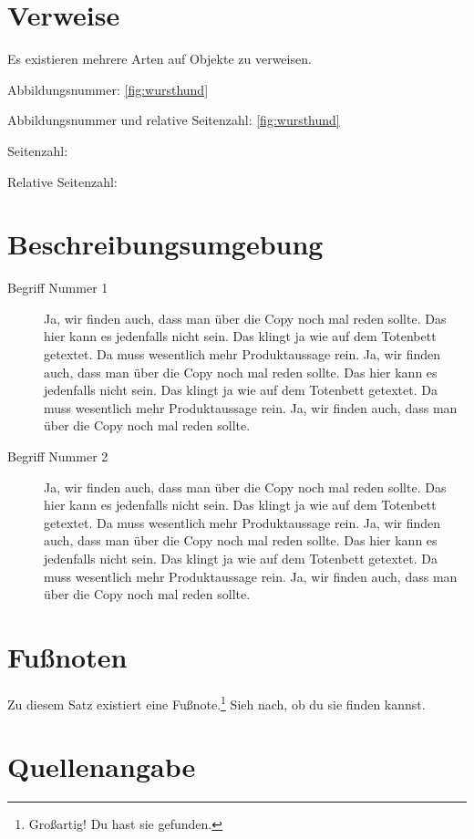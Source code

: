 \section{Verweise}

Es existieren mehrere Arten auf Objekte zu verweisen.

Abbildungsnummer: \ref{fig:wursthund}

Abbildungsnummer und relative Seitenzahl: \vref{fig:wursthund}

Seitenzahl: \pageref{fig:wursthund}

Relative Seitenzahl: 


\section{Beschreibungsumgebung}

\begin{description}
\item[Begriff Nummer 1] Ja, wir finden auch, dass man über die Copy noch mal reden sollte. Das hier kann es jedenfalls nicht sein. Das klingt ja wie auf dem Totenbett getextet. Da muss wesentlich mehr Produktaussage rein. Ja, wir finden auch, dass man über die Copy noch mal reden sollte. Das hier kann es jedenfalls nicht sein. Das klingt ja wie auf dem Totenbett getextet. Da muss wesentlich mehr Produktaussage rein. Ja, wir finden auch, dass man über die Copy noch mal reden sollte.
\item[Begriff Nummer 2] Ja, wir finden auch, dass man über die Copy noch mal reden sollte. Das hier kann es jedenfalls nicht sein. Das klingt ja wie auf dem Totenbett getextet. Da muss wesentlich mehr Produktaussage rein. Ja, wir finden auch, dass man über die Copy noch mal reden sollte. Das hier kann es jedenfalls nicht sein. Das klingt ja wie auf dem Totenbett getextet. Da muss wesentlich mehr Produktaussage rein. Ja, wir finden auch, dass man über die Copy noch mal reden sollte.
\end{description}


\section{Fußnoten}

Zu diesem Satz existiert eine Fußnote.\footnote{Großartig! Du hast sie gefunden.} Sieh nach, ob du sie finden kannst.


\section{Quellenangabe}

